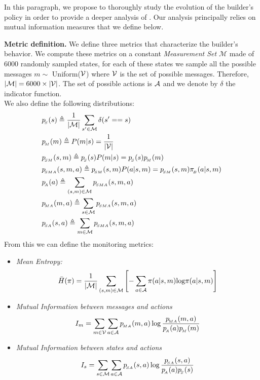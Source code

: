 In this paragraph, we propose to thoroughly study the evolution of the builder's policy in order to provide a deeper analysis of \abig. Our analysis principally relies on mutual information measures that we define below. 

\noindent\textbf{Metric definition. } We define three metrics that characterize the builder's behavior. We compute these metrics on a constant \emph{Measurement Set} $\mathcal{M}$ made of 6000 randomly sampled states, for each of these states we sample all the possible messages $m\sim$ Uniform(${\mathcal{V}}$) where ${\mathcal{V}}$ is the set of possible messages. Therefore, $|{\mathcal{M}}| = 6000\times|{\mathcal{V}}|$. The set of possible actions is ${\mathcal{A}}$ and we denote by $\delta$ the indicator function.\\

We also define the following distributions:
 \begin{align*}
     &\ps(s) \triangleq \frac{1}{|\gM|}\sum_{s'\in\gM}\delta(s'==s) \\
     &\pM(m) \triangleq P(m|s) =  \frac{1}{|\gV|}\\
     &\psm(s,m) \triangleq \ps(s)P(m|s) = \ps(s)\pM(m)\\
     &\psma(s,m,a) \triangleq \psm(s,m)P(a|s,m) = \psm(s,m)\pib(a|s,m)\\
    & \pa(a) \triangleq \sum_{(s,m)\in \gM} \psma(s,m,a)\\
     &\pma(m,a)\triangleq \sum_{s\in\gM}\psma(s,m,a)\\
     &\psa(s,a)  \triangleq \sum_{m\in\gM}\psma(s,m,a)
 \end{align*}
From this we can define the monitoring metrics:
\begin{itemize}[noitemsep,topsep=0pt]
    \item \textit{Mean Entropy: }
    $$\bar{H}(\pi)=\frac{1}{|{\mathcal{M}}|}\sum_{(s,m)\in \mathcal{M}} \left[ - \sum_{a\in {\mathcal{A}}}\pi(a|s,m)\text{log}\pi(a|s,m)\right]$$ 
    \item \textit{Mutual Information between messages and actions}
    $$I_m = \sum_{m\in {\mathcal{V}}}\sum_{a\in {\mathcal{A}}}p_{\!_{MA}}(m,a)\log\frac{p_{\!_{MA}}(m,a)}{p_{\!_A}(a)p_{\!_M}(m)}$$
    \item \textit{Mutual Information between states and actions}
    $$I_s = \sum_{s\in {\mathcal{M}}}\sum_{a\in {\mathcal{A}}}p_{\!_{SA}}(s,a)\log\frac{p_{\!_{SA}}(s,a)}{p_{\!_A}(a)p_{\!_S}(s)} $$
\end{itemize}

